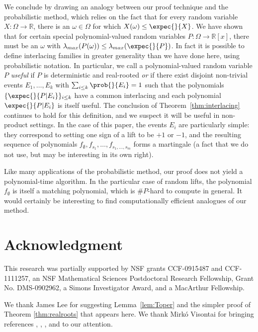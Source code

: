 \documentclass[11pt]{article}
\newcommand{\R}{\mathbb{R}}
\begin{document}
We conclude by drawing an analogy between our proof technique and the
probabilistic method, which relies on the fact
that for every random variable $X:\Omega \rightarrow \R$, there is 
an $\omega\in\Omega$ for which $X(\omega)\le \expec{}{X}$. 
We have shown that for certain special polynomial-valued random variables $P:\Omega\rightarrow \R[x]$, there must be an $\omega$ with $\lambda_{max}(P(\omega))\le
\lambda_{max}(\expec{}{P})$. 
In fact it is possible to define interlacing families in greater generality than we have done here, using probabilistic notation. 
In particular, we call a polynomial-valued random
variable $P$ {\em useful} if $P$ is deterministic and real-rooted {\em or} if there exist disjoint
non-trivial events $E_1,\ldots, E_k$ with $\sum_{i\le k} \prob{}{E_i}=1$ such
that the polynomials $\{\expec{}{P|E_i}\}_{i\le k}$ have a common interlacing and each
polynomial $\expec{}{P|E_i}$ is itself useful. 
The conclusion of Theorem~\ref{thm:interlacing} continues to hold for this definition, and we suspect it will be useful in non-product settings. 
In the case of this paper, the
events $E_i$ are particularly simple: they correspond to setting one sign of a
lift to be $+1$ or $-1$, and the resulting sequence of polynomials
$f_\emptyset,f_{s_1},\ldots,f_{s_1,\ldots,s_m}$ forms a martingale (a fact that we do not use, but may be interesting in its own right).

Like many applications of the probabilistic method, our proof does not yield a
polynomial-time algorithm. 
In the particular case of random lifts, the
polynomial $f_\emptyset$ is itself a matching polynomial, which is $\# P$-hard
to compute in general. 
It would certainly be interesting to find computationally efficient analogues of our method.


\section*{Acknowledgment}
This research was partially supported by NSF grants CCF-0915487 and  CCF-1111257,
  an NSF Mathematical Sciences Postdoctoral Research Fellowship, Grant No. DMS-0902962,
  a Simons Investigator Award, and a MacArthur Fellowship.

We thank James Lee for suggesting Lemma~\ref{lem:Toper} and the simpler proof of Theorem \ref{thm:realroots} that appears here.
We thank Mirk{\'o} Visontai for bringing references \cite{GodsilGutman}, \cite{Fell}, 
  \cite{ChudnovskySeymour}, and \cite{Dedieu} to our attention.

\end{document}
